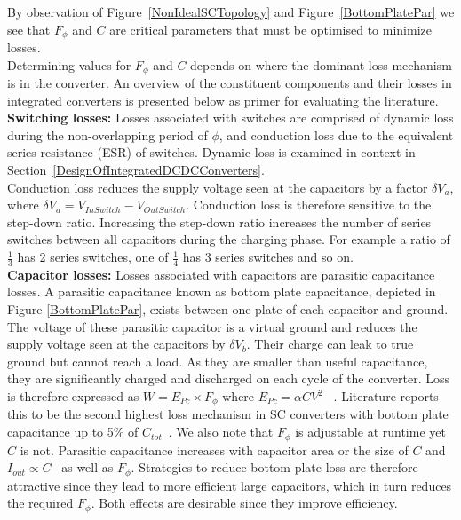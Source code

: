 \documentclass[letterpaper,twocolumn,10pt]{article}
\begin{document}
By observation of Figure~\ref{NonIdealSCTopology} and Figure~\ref{BottomPlatePar} we see that $F_\phi$ and $C$ are critical parameters that must be optimised to minimize losses.\\
Determining values for $F_\phi$ and $C$ depends on where the dominant loss mechanism is in the converter. An overview of the constituent components and their losses in integrated converters is presented below as primer for evaluating the literature.\\ 
\textbf{Switching losses: }Losses associated with switches are comprised of dynamic loss during the non-overlapping period of $\phi$, and conduction loss due to the equivalent series resistance (ESR) of switches. Dynamic loss is examined in context in Section~\ref{DesignOfIntegratedDCDCConverters}.\\
Conduction loss reduces the supply voltage seen at the capacitors by a factor $\delta V_a$, where $\delta V_a = V_{In Switch} - V_{Out Switch}$. Conduction loss is therefore sensitive to the step-down ratio. Increasing the step-down ratio increases the number of series switches between all capacitors during the charging phase. For example a ratio of $\frac{1}{3}$ has 2 series switches, one of $\frac{1}{4}$ has 3 series switches and so on.\\
\textbf{Capacitor losses: }Losses associated with capacitors are parasitic capacitance losses. A parasitic capacitance known as bottom plate capacitance, depicted in Figure \ref{BottomPlatePar}, exists between one plate of each capacitor and ground. The voltage of these parasitic capacitor is a virtual ground and reduces the supply voltage seen at the capacitors by $\delta V_b$. Their charge can leak to true ground but cannot reach a load. As they are smaller than useful capacitance, they are significantly charged and discharged on each cycle of the converter. Loss is therefore expressed as $W = E_{Pc} \times F_\phi$ where $E_{Pc} = \alpha CV^2$ ~\cite{Damak2013}. Literature reports this to be the second highest loss mechanism in SC converters with bottom plate capacitance up to 5\% of $C_{tot}$~\cite{Ramadass2007}. We also note that $F_\phi$ is adjustable at runtime yet $C$ is not. Parasitic capacitance increases with capacitor area or the size of $C$ and $I_{out} \propto C$~\cite{Damak2013} as well as $F_\phi$. Strategies to reduce bottom plate loss are therefore attractive since they lead to more efficient large capacitors, which in turn reduces the required $F_\phi$. Both effects are desirable since they improve efficiency.\\
\end{document}
